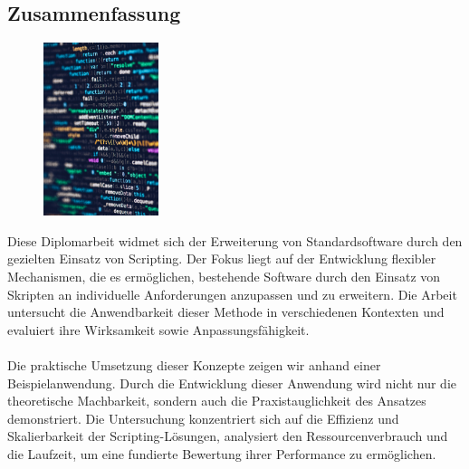 \newpage
\begin{spacing}{1}
    \chapter*{Zusammenfassung}
\end{spacing}
\begin{figure}
    \begin{center}
      \includegraphics[width=0.3\textwidth]{pics/coding.jpg}
    \end{center}
\end{figure}
Diese Diplomarbeit widmet sich der Erweiterung von Standardsoftware durch den gezielten Einsatz 
von Scripting. Der Fokus liegt auf der Entwicklung flexibler Mechanismen, die es ermöglichen, 
bestehende Software durch den Einsatz von Skripten an individuelle Anforderungen anzupassen und 
zu erweitern. Die Arbeit untersucht die Anwendbarkeit dieser Methode in verschiedenen Kontexten 
und evaluiert ihre Wirksamkeit sowie Anpassungsfähigkeit.
\\\\
Die praktische Umsetzung dieser Konzepte zeigen wir anhand einer Beispielanwendung. Durch die 
Entwicklung dieser Anwendung wird nicht nur die theoretische Machbarkeit, sondern auch die 
Praxistauglichkeit des Ansatzes demonstriert. Die Untersuchung konzentriert sich auf die Effizienz 
und Skalierbarkeit der Scripting-Lösungen, analysiert den Ressourcenverbrauch und die Laufzeit, 
um eine fundierte Bewertung ihrer Performance zu ermöglichen.
